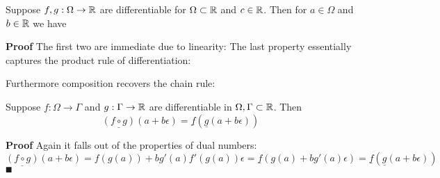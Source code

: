 \begin{definition}
\begin{lemma} Suppose $f,g : \Omega \rightarrow {\mathbb R}$ are differentiable for $\Omega \subset {\mathbb R}$ and $c \in {\mathbb R}$. Then for $a \ensuremath{\in} \ensuremath{\Omega}$ and $b \in {\mathbb R}$ we have
\end{lemma}
\textbf{Proof} The first two are immediate due to linearity:
The last property essentially captures the product rule of differentiation:
\end{definition}

Furthermore composition recovers the chain rule:

\begin{lemma}[composition]  Suppose $f : \ensuremath{\Omega} \ensuremath{\rightarrow} \ensuremath{\Gamma}$ and $g : \Gamma \rightarrow {\mathbb R}$ are differentiable in $\Omega,\Gamma \subset {\mathbb R}$. Then
\[
\underline{(f \ensuremath{\circ} g)}(a+b \ensuremath{\epsilon}) = \underline{f}(\underline{g}(a+b\ensuremath{\epsilon}))
\]
\end{lemma}
\textbf{Proof} Again it falls out of the properties of dual numbers:
\[
\underline{(f \ensuremath{\circ} g)}(a+b \ensuremath{\epsilon}) = f(g(a)) + bg'(a) f'(g(a)) \ensuremath{\epsilon} = \underline{f}(g(a)+bg'(a)\ensuremath{\epsilon}) = \underline{f}(\underline{g}(a+b\ensuremath{\epsilon}))
\]
\ensuremath{\QED}

